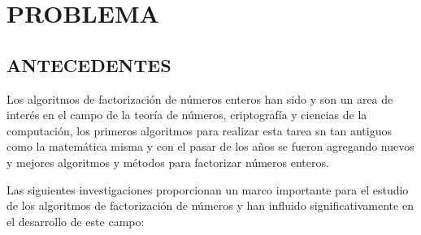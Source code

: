     \section{PROBLEMA}
        \subsection{ANTECEDENTES}
        Los algoritmos de factorización de números enteros han sido y son un area de interés en el campo de la teoría de números, criptografía y ciencias de la computación, los primeros algoritmos para realizar esta tarea sn tan antiguos como la matemática misma y con el pasar de los años se fueron agregando nuevos y mejores algoritmos y métodos para factorizar números enteros.

        Las siguientes investigaciones proporcionan un marco importante para el estudio de los algoritmos de factorización de números y han influido significativamente en el desarrollo de este campo:

